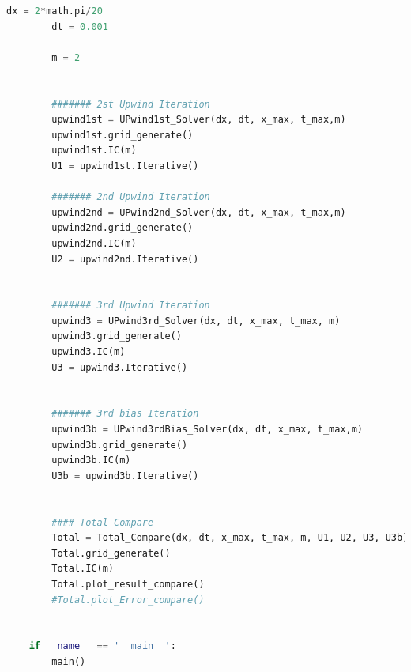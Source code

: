 \documentclass[12pt]{article}
\begin{document}
\begin{scriptsize}
\begin{lstlisting}[language=python,caption={Problem1, Py code for Solvers}]
        dx = 2*math.pi/20
        dt = 0.001
    
        m = 2
        
        
        ####### 2st Upwind Iteration
        upwind1st = UPwind1st_Solver(dx, dt, x_max, t_max,m)
        upwind1st.grid_generate()
        upwind1st.IC(m)
        U1 = upwind1st.Iterative()
    
        ####### 2nd Upwind Iteration
        upwind2nd = UPwind2nd_Solver(dx, dt, x_max, t_max,m)
        upwind2nd.grid_generate()
        upwind2nd.IC(m)
        U2 = upwind2nd.Iterative()
    
    
        ####### 3rd Upwind Iteration
        upwind3 = UPwind3rd_Solver(dx, dt, x_max, t_max, m)
        upwind3.grid_generate()
        upwind3.IC(m)
        U3 = upwind3.Iterative()
  
    
        ####### 3rd bias Iteration
        upwind3b = UPwind3rdBias_Solver(dx, dt, x_max, t_max,m)
        upwind3b.grid_generate()
        upwind3b.IC(m)
        U3b = upwind3b.Iterative()
    
    
        #### Total Compare
        Total = Total_Compare(dx, dt, x_max, t_max, m, U1, U2, U3, U3b)
        Total.grid_generate()
        Total.IC(m)
        Total.plot_result_compare()
        #Total.plot_Error_compare()
        
   
    if __name__ == '__main__':
        main()
    
    
    
\end{lstlisting}
\end{scriptsize}




\end{document}
